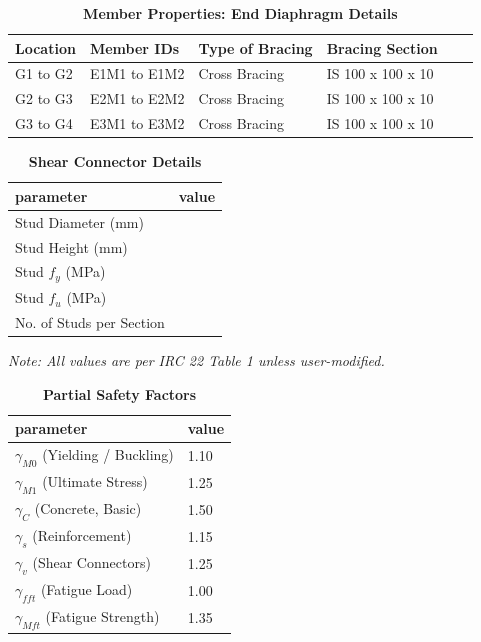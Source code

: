 \documentclass[12pt,a4paper]{report}
\numberwithin{table}{chapter}
\numberwithin{figure}{chapter}
\begin{document}
\begin{longtable}{|L{2.2cm}|L{2.2cm}|L{3.0cm}|L{2.5cm}|C{1.8cm}|C{1.8cm}|}
\caption{\textbf{Member Properties: End Diaphragm Details}}
\hline
\textbf{Location} & \textbf{Member IDs} & \textbf{Type of Bracing} & \textbf{Bracing Section} \\
\hline
G1 to G2 & E1M1 to E1M2 & Cross Bracing & IS 100 x 100 x 10 \\[6pt]
\hline
G2 to G3 & E2M1 to E2M2 & Cross Bracing & IS 100 x 100 x 10 \\[6pt]
\hline
G3 to G4 & E3M1 to E3M2 & Cross Bracing & IS 100 x 100 x 10 \\[6pt]
\hline
\end{longtable}



\label{subsec:shear-connectors}

\vspace{2.2em}

\vspace{0.4em}
\begin{longtable}{|L{5.5cm}|p{10.0cm}|}
\caption{\textbf{Shear Connector Details}}
\hline
\textbf{parameter} & \textbf{value} \\
\hline
\textnormal{Stud Diameter (mm)} &  \\[6pt]
\hline
\textnormal{Stud Height (mm)} &  \\[6pt]
\hline
\textnormal{Stud $f_y$ (MPa)} &  \\[6pt]
\hline
\textnormal{Stud $f_u$ (MPa)} &  \\[6pt]
\hline
\textnormal{No. of Studs per Section} &  \\[6pt]
\hline
\end{longtable}



\label{subsec:safety-factors}

\vspace{2.2em}

\vspace{0.3em}
\noindent\textit{Note: All values are per IRC 22 Table 1 unless user-modified.}

\vspace{0.4em}
\begin{longtable}{|L{5.5cm}|p{10.0cm}|}
\caption{\textbf{Partial Safety Factors}}
\hline
\textbf{parameter} & \textbf{value} \\
\hline
\textnormal{$\gamma_{M0}$ (Yielding / Buckling)} & 1.10 \\[6pt]
\hline
\textnormal{$\gamma_{M1}$ (Ultimate Stress)} & 1.25 \\[6pt]
\hline
\textnormal{$\gamma_C$ (Concrete, Basic)} & 1.50 \\[6pt]
\hline
\textnormal{$\gamma_s$ (Reinforcement)} & 1.15 \\[6pt]
\hline
\textnormal{$\gamma_v$ (Shear Connectors)} & 1.25 \\[6pt]
\hline
\textnormal{$\gamma_{fft}$ (Fatigue Load)} & 1.00 \\[6pt]
\hline
\textnormal{$\gamma_{Mft}$ (Fatigue Strength)} & 1.35 \\[6pt]
\hline
\end{longtable}
\end{document}
